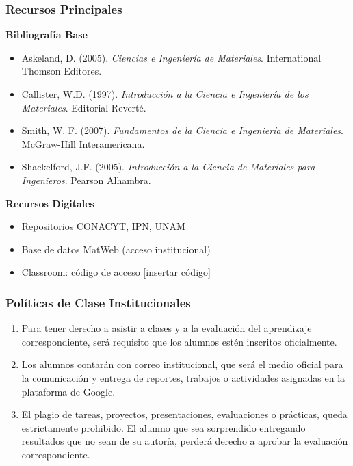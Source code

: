 \documentclass{beamer}
\begin{document}
\begin{frame}
    \frametitle{Recursos Principales}
    
    \textbf{Bibliografía Base}
    \begin{itemize}
        \item Askeland, D. (2005). \textit{Ciencias e Ingeniería de Materiales}. International Thomson Editores.
        \item Callister, W.D. (1997). \textit{Introducción a la Ciencia e Ingeniería de los Materiales}. Editorial Reverté.
        \item Smith, W. F. (2007). \textit{Fundamentos de la Ciencia e Ingeniería de Materiales}. McGraw-Hill Interamericana.
        \item Shackelford, J.F. (2005). \textit{Introducción a la Ciencia de Materiales para Ingenieros}. Pearson Alhambra.
    \end{itemize}
    \vspace{0.3cm}
    
    \textbf{Recursos Digitales}
    \begin{itemize}
        \item Repositorios CONACYT, IPN, UNAM
        \item Base de datos MatWeb (acceso institucional)
        \item Classroom: código de acceso [insertar código]
    \end{itemize}
\end{frame}

\begin{frame}
    \frametitle{Políticas de Clase Institucionales}
    \begin{enumerate}
        \item Para tener derecho a asistir a clases y a la evaluación del aprendizaje correspondiente, será requisito que los alumnos estén inscritos oficialmente.
        
        \item Los alumnos contarán con correo institucional, que será el medio oficial para la comunicación y entrega de reportes, trabajos o actividades asignadas en la plataforma de Google.
        
        \item El plagio de tareas, proyectos, presentaciones, evaluaciones o prácticas, queda estrictamente prohibido. El alumno que sea sorprendido entregando resultados que no sean de su autoría, perderá derecho a aprobar la evaluación correspondiente.
    \end{enumerate}
\end{frame}
\end{document}
